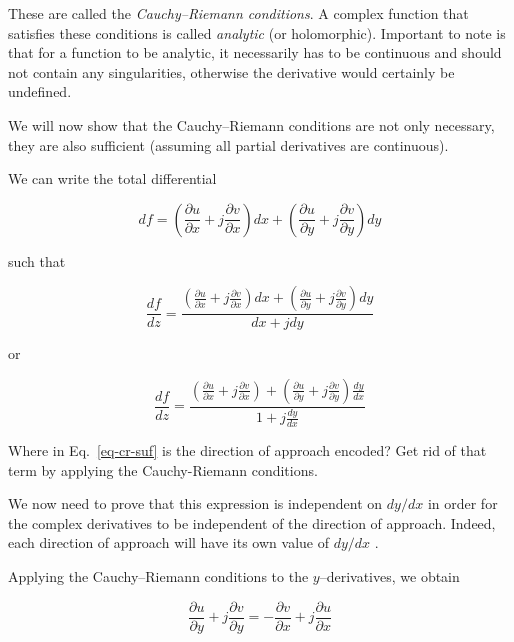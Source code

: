 These are called the \emph{Cauchy--Riemann conditions}. A complex function that satisfies these conditions is called \emph{analytic} (or holomorphic). Important to note is that for a function to be analytic, it necessarily has to be continuous and should not contain any singularities, otherwise the derivative would certainly be undefined.

We will now show that the Cauchy--Riemann conditions are not only necessary, they are also sufficient (assuming all partial derivatives are continuous).

We can write the total differential

\begin{equation}
d f = \left( \frac{\partial u}{\partial x}+j\frac{\partial v}{\partial x}\right) d x+\left(\frac{\partial u}{\partial y}+j\frac{\partial v}{\partial y}\right) d y
\end{equation} 

such that

\begin{equation}
\frac{d f}{d z} = \frac{\left(\frac{\partial u}{\partial x}+j\frac{\partial v}{\partial x}\right) d x+\left(\frac{\partial u}{\partial y}+j\frac{\partial v}{\partial y}\right) d y}{d x + j d y}
\end{equation} 

or

\begin{equation}
\frac{d f}{d z} = \frac{\left(\frac{\partial u}{\partial x}+j\frac{\partial v}{\partial x}\right) +\left(\frac{\partial u}{\partial y}+j\frac{\partial v}{\partial y}\right) \frac{d y}{d x}}{1 + j \frac{d y}{d x}} \label{eq-cr-suf}
\end{equation} 

\begin{cue}
Where in Eq.~\ref{eq-cr-suf} is the direction of approach encoded? Get rid of that term by applying the Cauchy-Riemann conditions.
\end{cue}

We now need to prove that this expression is independent on $d y / d x$ in order for the complex derivatives to be independent of the direction of approach. Indeed, each direction of approach will have its own value of $d y / d x$ .

Applying the Cauchy--Riemann conditions to the $y$--derivatives, we obtain

\begin{equation}
\frac{\partial u}{\partial y}+j\frac{\partial v}{\partial y} = -\frac{\partial v}{\partial x}+j\frac{\partial u}{\partial x}
\end{equation}


